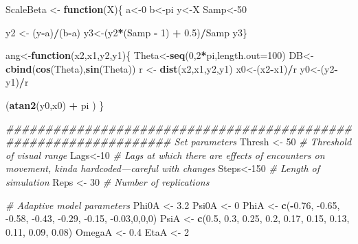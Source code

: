 \documentclass[
]{article}
\newenvironment{Shaded}{\begin{snugshade}}{\end{snugshade}}
\newcommand{\CommentTok}[1]{\textcolor[rgb]{0.56,0.35,0.01}{\textit{#1}}}
\newcommand{\ControlFlowTok}[1]{\textcolor[rgb]{0.13,0.29,0.53}{\textbf{#1}}}
\newcommand{\DataTypeTok}[1]{\textcolor[rgb]{0.13,0.29,0.53}{#1}}
\newcommand{\DecValTok}[1]{\textcolor[rgb]{0.00,0.00,0.81}{#1}}
\newcommand{\FloatTok}[1]{\textcolor[rgb]{0.00,0.00,0.81}{#1}}
\newcommand{\KeywordTok}[1]{\textcolor[rgb]{0.13,0.29,0.53}{\textbf{#1}}}
\newcommand{\NormalTok}[1]{#1}
\newcommand{\OperatorTok}[1]{\textcolor[rgb]{0.81,0.36,0.00}{\textbf{#1}}}
\newcommand{\StringTok}[1]{\textcolor[rgb]{0.31,0.60,0.02}{#1}}
\begin{document}
\begin{Shaded}
\begin{Highlighting}[]
{\NormalTok{    ScaleBeta <-}\StringTok{ }\ControlFlowTok{function}\NormalTok{(X)\{}
\NormalTok{     a<-}\DecValTok{0}
\NormalTok{     b<-pi}
\NormalTok{     y<-X}
\NormalTok{     Samp<-}\DecValTok{50}
    
\NormalTok{     y2 <-}\StringTok{ }\NormalTok{(y}\OperatorTok{-}\NormalTok{a)}\OperatorTok{/}\NormalTok{(b}\OperatorTok{-}\NormalTok{a)}
\NormalTok{     y3<-(y2}\OperatorTok{*}\NormalTok{(Samp }\OperatorTok{-}\StringTok{ }\DecValTok{1}\NormalTok{) }\OperatorTok{+}\StringTok{ }\FloatTok{0.5}\NormalTok{)}\OperatorTok{/}\NormalTok{Samp}
\NormalTok{     y3\}}
    
\NormalTok{    ang<-}\ControlFlowTok{function}\NormalTok{(x2,x1,y2,y1)\{}
\NormalTok{      Theta<-}\KeywordTok{seq}\NormalTok{(}\DecValTok{0}\NormalTok{,}\DecValTok{2}\OperatorTok{*}\NormalTok{pi,}\DataTypeTok{length.out=}\DecValTok{100}\NormalTok{)}
\NormalTok{      DB<-}\KeywordTok{cbind}\NormalTok{(}\KeywordTok{cos}\NormalTok{(Theta),}\KeywordTok{sin}\NormalTok{(Theta))}
\NormalTok{       r <-}\StringTok{ }\KeywordTok{dist}\NormalTok{(x2,x1,y2,y1)}
\NormalTok{       x0<-(x2}\OperatorTok{-}\NormalTok{x1)}\OperatorTok{/}\NormalTok{r}
\NormalTok{       y0<-(y2}\OperatorTok{-}\NormalTok{y1)}\OperatorTok{/}\NormalTok{r}
    
\NormalTok{       (}\KeywordTok{atan2}\NormalTok{(y0,x0) }\OperatorTok{+}\StringTok{ }\NormalTok{pi )}
\NormalTok{       \}}
    
    \CommentTok{################################################################# Set parameters}
\NormalTok{    Thresh <-}\StringTok{ }\DecValTok{50}         \CommentTok{# Threshold of visual range}
\NormalTok{    Lags<-}\DecValTok{10}             \CommentTok{# Lags at which there are effects of encounters on movement, kinda hardcoded---careful with changes}
\NormalTok{    Steps<-}\DecValTok{150}           \CommentTok{# Length of simulation}
\NormalTok{    Reps <-}\StringTok{ }\DecValTok{30}           \CommentTok{# Number of replications}
    
    \CommentTok{# Adaptive model parameters}
\NormalTok{    Phi0A <-}\StringTok{ }\FloatTok{3.2}
\NormalTok{    Psi0A <-}\StringTok{ }\DecValTok{0}
\NormalTok{    PhiA  <-}\StringTok{ }\KeywordTok{c}\NormalTok{(}\OperatorTok{-}\FloatTok{0.76}\NormalTok{, }\FloatTok{-0.65}\NormalTok{, }\FloatTok{-0.58}\NormalTok{, }\FloatTok{-0.43}\NormalTok{, }\FloatTok{-0.29}\NormalTok{, }\FloatTok{-0.15}\NormalTok{, }\FloatTok{-0.03}\NormalTok{,}\DecValTok{0}\NormalTok{,}\DecValTok{0}\NormalTok{,}\DecValTok{0}\NormalTok{)}
\NormalTok{    PsiA <-}\StringTok{ }\KeywordTok{c}\NormalTok{(}\FloatTok{0.5}\NormalTok{, }\FloatTok{0.3}\NormalTok{, }\FloatTok{0.25}\NormalTok{, }\FloatTok{0.2}\NormalTok{, }\FloatTok{0.17}\NormalTok{, }\FloatTok{0.15}\NormalTok{, }\FloatTok{0.13}\NormalTok{, }\FloatTok{0.11}\NormalTok{, }\FloatTok{0.09}\NormalTok{, }\FloatTok{0.08}\NormalTok{)}
\NormalTok{    OmegaA <-}\StringTok{ }\FloatTok{0.4}
\NormalTok{    EtaA <-}\StringTok{ }\DecValTok{2}
    
}
\end{Highlighting}
\end{Shaded}
\end{document}
